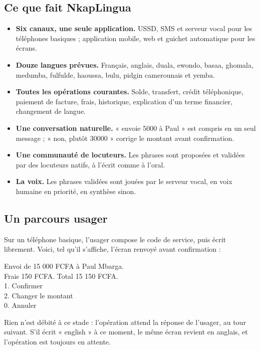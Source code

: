 \documentclass[11pt,a4paper]{article}
\begin{document}
\subsection{Ce que fait NkapLingua}
\begin{itemize}
  \item \textbf{Six canaux, une seule application.} USSD, SMS et serveur vocal pour les téléphones basiques ; application mobile, web et guichet automatique pour les écrans.
  \item \textbf{Douze langues prévues.} Français, anglais, duala, ewondo, basaa, ghomala, medumba, fulfulde, haoussa, bulu, pidgin camerounais et yemba.
  \item \textbf{Toutes les opérations courantes.} Solde, transfert, crédit téléphonique, paiement de facture, frais, historique, explication d'un terme financier, changement de langue.
  \item \textbf{Une conversation naturelle.} « envoie 5000 à Paul » est compris en un seul message ; « non, plutôt 30000 » corrige le montant avant confirmation.
  \item \textbf{Une communauté de locuteurs.} Les phrases sont proposées et validées par des locuteurs natifs, à l'écrit comme à l'oral.
  \item \textbf{La voix.} Les phrases validées sont jouées par le serveur vocal, en voix humaine en priorité, en synthèse sinon.
\end{itemize}

\subsection{Un parcours usager}
Sur un téléphone basique, l'usager compose le code de service, puis écrit librement. Voici, tel qu'il s'affiche, l'écran renvoyé avant confirmation :

\begin{ecran}
\color{white}\ttfamily\small
Envoi de 15 000 FCFA à Paul Mbarga.\\
Frais 150 FCFA. Total 15 150 FCFA.\\
1. Confirmer\\
2. Changer le montant\\
0. Annuler
\end{ecran}

Rien n'est débité à ce stade : l'opération attend la réponse de l'usager, au tour suivant. S'il écrit « english » à ce moment, le même écran revient en anglais, et l'opération est toujours en attente.
\end{document}
